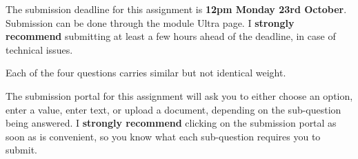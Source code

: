 \documentclass[11pt,a4paper]{article}
\begin{document}

\setcounter{section}{1}

\setcounter{aufg}{0}


The submission deadline for this assignment is \textbf{12pm Monday 23rd October}. Submission can be done through the module Ultra page. I \textbf{strongly recommend} submitting at least a few hours ahead of the deadline, in case of technical issues.

Each of the four questions carries similar but not identical weight.

The submission portal for this assignment will ask you to either choose an option, enter a value, enter text, or upload a document, depending on the sub-question being answered. I \textbf{strongly recommend} clicking on the submission portal as soon as is convenient, so you know what each sub-question requires you to submit.

\vspace{0.2cm}
\end{document}
